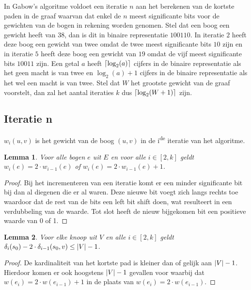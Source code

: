 \documentclass[conference]{IEEEtran}
\newtheorem{lemma}{Lemma}[section]
\theoremstyle{definition}
\theoremstyle{remark}
\DeclarePairedDelimiter{\ceil}{\lceil}{\rceil}
\DeclarePairedDelimiter{\card}{\vert}{\vert}  %
\begin{document}
In Gabow's algoritme voldoet een iteratie $n$ aan het berekenen van de kortste paden in de graaf waarvan dat enkel de $n$ meest significante bits voor de gewichten van de bogen in rekening worden genomen. Stel dat een boog een gewicht heeft van $38$, dan is dit in binaire representatie $100110$. In iteratie $2$ heeft deze boog een gewicht van twee omdat de twee meest significante bits $10$ zijn en in iteratie $5$ heeft deze boog een gewicht van $19$ omdat de vijf meest significante bits $10011$ zijn. Een getal $a$ heeft $\ceil{\log_2(a)}$ cijfers in de binaire representatie als het geen macht is van twee en $\log_2(a) + 1$ cijfers in de binaire representatie als het wel een macht is van twee. Stel dat $W$ het grootste gewicht van de graaf voorstelt, dan zal het aantal iteraties $k$ dus $\ceil{\log_2(W + 1)}$ zijn.

\subsection{Iteratie n}
$w_i(u, v)$ is het gewicht van de boog $(u, v)$ in de i\textsuperscript{de} iteratie van het algoritme.
\begin{lemma} \label{scaling:doubleThePrevious}
    Voor alle bogen $e$ uit $E$ en voor alle $i \in [2, k]$ geldt $w_i(e) = 2 \cdot w_{i-1}(e)$ of $w_i(e) = 2 \cdot w_{i-1}(e) + 1$.
\end{lemma}
\begin{proof}
    Bij het incrementeren van een iteratie komt er een minder significante bit bij dan al diegenen die er al waren. Deze nieuwe bit voegt zich langs rechts toe waardoor dat de rest van de bits een left bit shift doen, wat resulteert in een verdubbeling van de waarde. Tot slot heeft de nieuw bijgekomen bit een positieve waarde van 0 of 1.
\end{proof}

\begin{lemma} \label{theorem:maxTheAmountOfVertices}
    Voor elke knoop uit $V$ en alle $i \in [2, k]$ geldt $\delta_i(s_0) - 2 \cdot \delta_{i-1}(s_0, v) \leq \card{V} -1$.
\end{lemma}

\begin{proof}
    De kardinaliteit van het kortste pad is kleiner dan of gelijk aan $\card{V} - 1$. Hierdoor komen er ook hoogstens $\card{V} - 1$ gevallen voor waarbij dat $w(e_i) = 2 \cdot w(e_{i-1}) + 1$ in de plaats van $w(e_i) = 2 \cdot w(e_{i-1})$.
\end{proof}
\end{document}
